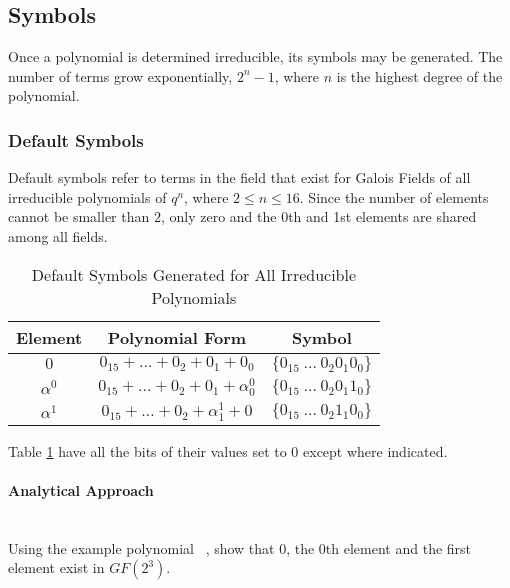 \subsection{Symbols}

    Once a polynomial is determined irreducible, its symbols may be generated.
    The number of terms grow exponentially, $2^{n}-1$, where $n$ is the highest
    degree of the polynomial.

    \subsubsection{Default Symbols}

    Default symbols refer to terms in the field that exist for Galois Fields of
    all irreducible polynomials of $q^n$, where $2 \leq n
    \leq 16$. Since the number of elements cannot be smaller than $2$, only
    zero and the 0th and 1st elements are shared among all fields.

    \begin{table}[h]
        \def\arraystretch{2.5}
        \caption{Default Symbols Generated for All Irreducible Polynomials}
        \centering
        \begin{tabular*}{300pt}{@{\extracolsep{\fill}} ccc}

        \textbf{Element} & \textbf{Polynomial Form} & \textbf{Symbol}
        \\
        \hline $0$ & $0_{15} + \ldots + 0_{2} + 0_{1} + 0_{0}$ & $\{ 0_{15} \
        \ldots \ 0_{2} 0_{1} 0_{0} \}$ \\

        $\alpha^{0}$ & $0_{15} + \ldots + 0_{2} + 0_{1} +
        \alpha^{0}_{0}$ & $\{0_{15} \ \ldots \ 0_{2} 0_{1} 1_{0} \}$ \\

        $\alpha^{1}$ & $0_{15} + \ldots + 0_{2} + \alpha^{1}_{1} + 0$ & $\{
        0_{15} \ \ldots \ 0_{2} 1_{1} 0_{0} \}$ \\

        \end{tabular*}
        \label{table:default_sym}
    \end{table}

    Table \ref{table:default_sym} have all the bits of their values set to $0$
    except where indicated.

        \paragraph{Analytical Approach} \leavevmode\\ Using the example
        polynomial \examplepoly~, show that 0, the 0th element and the first
        element exist in $GF(2^{3})$.

